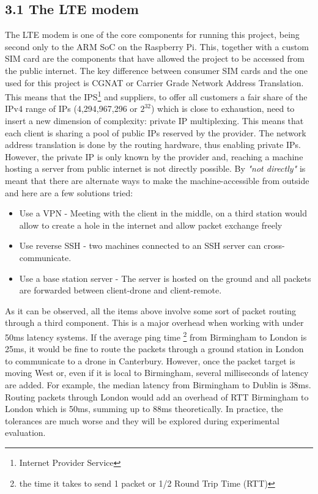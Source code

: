 \documentclass{IEEEtran}
\begin{document}
\subsection*{{3.1 The LTE modem}}
The LTE modem is one of the core components for running this project, being second only to the ARM SoC on the Raspberry Pi.
\newline
This, together with a custom SIM card are the components that have allowed the project to be accessed from the public internet. The key difference between consumer SIM cards and the one used for this project is CGNAT or Carrier Grade Network Address Translation. This means that the IPS\footnote{Internet Provider Service} and suppliers, to offer all customers a fair share of the IPv4 range of IPs (4,294,967,296 or $2^{32}$) which is close to exhaustion, need to insert a new dimension of complexity: private IP multiplexing. This means that each client is sharing a pool of public IPs reserved by the provider. The network address translation is done by the routing hardware, thus enabling private IPs. However, the private IP is only known by the provider and, reaching a machine hosting a server from public internet is not directly possible. By \textit{"not directly"} is meant that there are alternate ways to make the machine-accessible from outside and here are a few solutions tried:
\begin{itemize}
    \item Use a VPN - Meeting with the client in the middle, on a third station would allow to create a hole in the internet and allow packet exchange freely
    \item Use reverse SSH - two machines connected to an SSH server can cross-communicate.
    \item Use a base station server - The server is hosted on the ground and all packets are forwarded between client-drone and client-remote.
\end{itemize}
As it can be observed, all the items above involve some sort of packet routing through a third component. This is a major overhead when working with under 50ms latency systems. If the average ping time \footnote{the time it takes to send 1 packet or 1/2 Round Trip Time (RTT)} from Birmingham to London is 25ms, it would be fine to route the packets through a ground station in London to communicate to a drone in Canterbury. However, once the packet target is moving West or, even if it is local to Birmingham, several milliseconds of latency are added. For example, the median latency from Birmingham to Dublin is 38ms. Routing packets through London would add an overhead of RTT Birmingham to London which is 50ms, summing up to 88ms theoretically. In practice, the tolerances are much worse and they will be explored during experimental evaluation.
\end{document}

